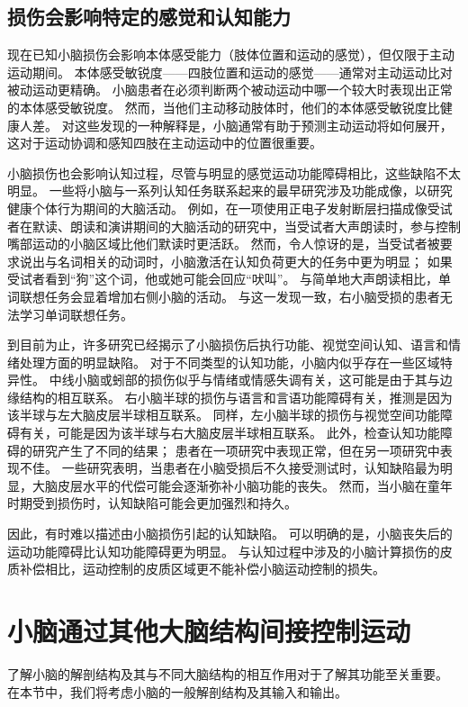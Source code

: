 \subsection{损伤会影响特定的感觉和认知能力}

现在已知小脑损伤会影响本体感受能力（肢体位置和运动的感觉），但仅限于主动运动期间。
本体感受敏锐度——四肢位置和运动的感觉——通常对主动运动比对被动运动更精确。
小脑患者在必须判断两个被动运动中哪一个较大时表现出正常的本体感受敏锐度。
然而，当他们主动移动肢体时，他们的本体感受敏锐度比健康人差。
对这些发现的一种解释是，小脑通常有助于预测主动运动将如何展开，这对于运动协调和感知四肢在主动运动中的位置很重要。


小脑损伤也会影响认知过程，尽管与明显的感觉运动功能障碍相比，这些缺陷不太明显。
一些将小脑与一系列认知任务联系起来的最早研究涉及功能成像，以研究健康个体行为期间的大脑活动。
例如，在一项使用正电子发射断层扫描成像受试者在默读、朗读和演讲期间的大脑活动的研究中，当受试者大声朗读时，参与控制嘴部运动的小脑区域比他们默读时更活跃。
然而，令人惊讶的是，当受试者被要求说出与名词相关的动词时，小脑激活在认知负荷更大的任务中更为明显；
如果受试者看到“狗”这个词，他或她可能会回应“吠叫”。
与简单地大声朗读相比，单词联想任务会显着增加右侧小脑的活动。
与这一发现一致，右小脑受损的患者无法学习单词联想任务。


到目前为止，许多研究已经揭示了小脑损伤后执行功能、视觉空间认知、语言和情绪处理方面的明显缺陷。
对于不同类型的认知功能，小脑内似乎存在一些区域特异性。
中线小脑或蚓部的损伤似乎与情绪或情感失调有关，这可能是由于其与边缘结构的相互联系。
右小脑半球的损伤与语言和言语功能障碍有关，推测是因为该半球与左大脑皮层半球相互联系。
同样，左小脑半球的损伤与视觉空间功能障碍有关，可能是因为该半球与右大脑皮层半球相互联系。
此外，检查认知功能障碍的研究产生了不同的结果；
患者在一项研究中表现正常，但在另一项研究中表现不佳。
一些研究表明，当患者在小脑受损后不久接受测试时，认知缺陷最为明显，大脑皮层水平的代偿可能会逐渐弥补小脑功能的丧失。
然而，当小脑在童年时期受到损伤时，认知缺陷可能会更加强烈和持久。


因此，有时难以描述由小脑损伤引起的认知缺陷。
可以明确的是，小脑丧失后的运动功能障碍比认知功能障碍更为明显。
与认知过程中涉及的小脑计算损伤的皮质补偿相比，运动控制的皮质区域更不能补偿小脑运动控制的损失。



\section{小脑通过其他大脑结构间接控制运动}

了解小脑的解剖结构及其与不同大脑结构的相互作用对于了解其功能至关重要。
在本节中，我们将考虑小脑的一般解剖结构及其输入和输出。


